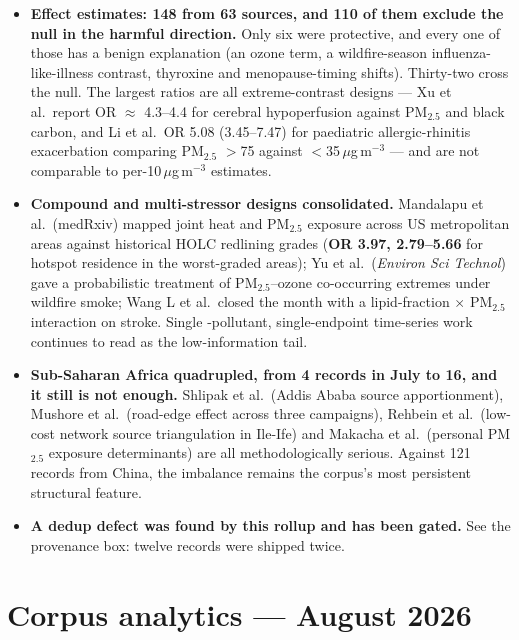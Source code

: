 \documentclass[10pt]{article}
\begin{document}
\begin{itemize}
\item \textbf{Effect estimates: 148 from 63 sources, and 110 of them exclude the null in
the harmful direction.} Only six were protective, and every one of those has a benign
explanation (an ozone term, a wildfire-season influenza-like-illness contrast, thyroxine
and menopause-timing shifts). Thirty-two cross the null. The largest ratios are all
extreme-contrast designs --- Xu et al.\ report OR $\approx$ 4.3--4.4 for cerebral
hypoperfusion against PM$_{2.5}$ and black carbon, and Li et al.\ OR 5.08 (3.45--7.47)
for paediatric allergic-rhinitis exacerbation comparing PM$_{2.5}$ $>$75 against
$<$35\,$\mu$g\,m$^{-3}$ --- and are not comparable to per-10\,$\mu$g\,m$^{-3}$ estimates.

\item \textbf{Compound and multi-stressor designs consolidated.} Mandalapu et al.\
(medRxiv) mapped joint heat and PM$_{2.5}$ exposure across US metropolitan areas against
historical HOLC redlining grades (\textbf{OR 3.97, 2.79--5.66} for hotspot residence in
the worst-graded areas); Yu et al.\ (\textit{Environ Sci Technol}) gave a probabilistic
treatment of PM$_{2.5}$--ozone co-occurring extremes under wildfire smoke; Wang L et al.\
closed the month with a lipid-fraction $\times$ PM$_{2.5}$ interaction on stroke. Single
-pollutant, single-endpoint time-series work continues to read as the low-information
tail.

\item \textbf{Sub-Saharan Africa quadrupled, from 4 records in July to 16, and it still
is not enough.} Shlipak et al.\ (Addis Ababa source apportionment), Mushore et al.\
(road-edge effect across three campaigns), Rehbein et al.\ (low-cost network source
triangulation in Ile-Ife) and Makacha et al.\ (personal PM$_{2.5}$ exposure determinants)
are all methodologically serious. Against 121 records from China, the imbalance remains
the corpus's most persistent structural feature.

\item \textbf{A dedup defect was found by this rollup and has been gated.} See the
provenance box: twelve records were shipped twice.
\end{itemize}

\clearpage

\section*{\sffamily\bfseries\color{Deep}Corpus analytics --- August 2026}
\vspace{-1.5mm}{\color{Coral}\rule{\linewidth}{1.1pt}}\vspace{2.5mm}
\end{document}
